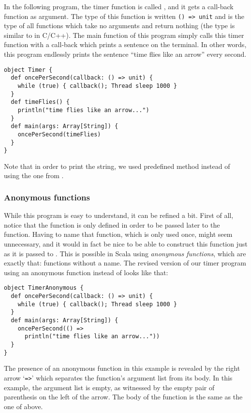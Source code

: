 \documentclass[a4paper,12pt,twoside,titlepage]{article}
\newcommand{\langname}[1]{#1\xspace}
\newcommand{\Scala}{\langname{Scala}}
\begin{document}
In the following program, the timer function is called
, and it gets a call-back function as argument.
The type of this function is written \verb|() => unit| and is the type
of all functions which take no arguments and return nothing (the type
 is similar to  in C/C++). The main function of
this program simply calls this timer function with a call-back which
prints a sentence on the terminal. In other words, this program
endlessly prints the sentence ``time flies like an arrow'' every
second.
\begin{lstlisting}
object Timer {
  def oncePerSecond(callback: () => unit) {
    while (true) { callback(); Thread sleep 1000 }
  }
  def timeFlies() {
    println("time flies like an arrow...")
  }
  def main(args: Array[String]) {
    oncePerSecond(timeFlies)
  }
}
\end{lstlisting}
Note that in order to print the string, we used predefined method
 instead of using the one from .

\subsubsection{Anonymous functions}
\label{sec:anonymous-functions}

While this program is easy to understand, it can be refined a bit.
First of all, notice that the function  is only
defined in order to be passed later to the 
function. Having to name that function, which is only used once, might
seem unnecessary, and it would in fact be nice to be able to construct
this function just as it is passed to . This is
possible in \Scala using \emph{anonymous functions}, which are exactly
that: functions without a name. The revised version of our timer
program using an anonymous function instead of  looks
like that:
\begin{lstlisting}
object TimerAnonymous {
  def oncePerSecond(callback: () => unit) {
    while (true) { callback(); Thread sleep 1000 }
  }
  def main(args: Array[String]) {
    oncePerSecond(() =>
      println("time flies like an arrow..."))
  }
}
\end{lstlisting}
The presence of an anonymous function in this example is revealed by
the right arrow `\verb|=>|' which separates the function's argument
list from its body. In this example, the argument list is empty, as
witnessed by the empty pair of parenthesis on the left of the arrow.
The body of the function is the same as the one of 
above.
\end{document}
